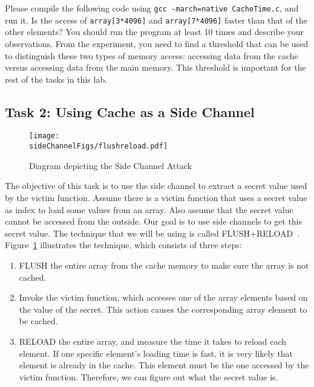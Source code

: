 Please compile the following code using \texttt{gcc -march=native
CacheTime.c}, and run it.  Is the access of 
\texttt{array[3*4096]} and \texttt{array[7*4096]} faster than
that of the other elements? You should run the program at least 10 times 
and describe your observations. From the experiment,
you need to find a threshold
that can be used to distinguish these two types of memory access: accessing
data from the cache versus accessing data from the main memory.  This
threshold is important for the rest of the tasks in this lab.


\subsection{Task 2: Using Cache as a Side Channel}


\begin{figure}[htb]
\centering
\texttt{[image: \\sideChannelFigs/flushreload.pdf]}
\caption{Diagram depicting the Side Channel Attack}
\label{sidechannel:fig:flushreload}
\end{figure}


The objective of this task is to use the side channel to extract a secret value used by the
victim function. Assume there is a victim  function that uses a secret value as index
to load some values from an array. Also assume that the secret value cannot be accessed from
the outside. Our goal is to use side channels to
get this secret value. The technique that we will be using is called 
FLUSH+RELOAD~\cite{Yarom2014}. Figure~\ref{sidechannel:fig:flushreload} illustrates the 
technique, which consists of three steps: 

\begin{enumerate}[noitemsep]

\item FLUSH the entire array from the cache memory to make sure the array is not cached. 

\item Invoke the victim function, which accesses one of the array
elements based on the value of the secret. This action causes 
the corresponding array element to be cached. 

\item RELOAD the entire array, and measure the time it takes to reload 
each element. If one specific element's loading time is fast, 
it is very likely that element is already in the cache. 
This element must be the one accessed by the victim function. 
Therefore, we can figure out what the secret value is.
\end{enumerate}


